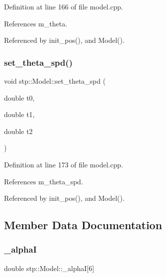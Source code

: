 Definition at line 166 of file model.\+cpp.



References m\+\_\+theta.



Referenced by init\+\_\+pos(), and Model().

\mbox{\label{classstp_1_1_model_afd0f76304578013e1faff062a318dac5}} 
\subsubsection{\texorpdfstring{set\+\_\+theta\+\_\+spd()}{set\_theta\_spd()}}
{\footnotesize\ttfamily void stp\+::\+Model\+::set\+\_\+theta\+\_\+spd (\begin{DoxyParamCaption}\item[{double}]{t0,  }\item[{double}]{t1,  }\item[{double}]{t2 }\end{DoxyParamCaption})\hspace{0.3cm}{\ttfamily [protected]}}



Definition at line 173 of file model.\+cpp.



References m\+\_\+theta\+\_\+spd.



Referenced by init\+\_\+pos(), and Model().



\subsection{Member Data Documentation}
\mbox{\label{classstp_1_1_model_a4679e65c69f376bf8f20f5b80635b79b}} 
\subsubsection{\texorpdfstring{\+\_\+alphaI}{\_alphaI}}
{\footnotesize\ttfamily double stp\+::\+Model\+::\+\_\+alphaI\mbox{[}6\mbox{]}\hspace{0.3cm}{\ttfamily [protected]}}



